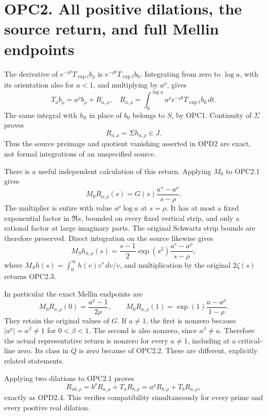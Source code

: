 \section{OPC2. All positive dilations, the source return, and full
Mellin
endpoints}\label{opc2.-all-positive-dilations-the-source-return-and-full-mellin-endpoints}

The derivative of \(e^{-\rho t}T_{\exp t}b_\rho\) is
\(e^{-\rho t}T_{\exp t}b_0\). Integrating from zero to \(\log a\), with
its orientation also for \(a<1\), and multiplying by \(a^\rho\), gives
\[
T_ab_\rho=a^\rho b_\rho+R_{a,\rho},
\quad
R_{a,\rho}=\int_0^{\log a}a^\rho e^{-\rho t}T_{\exp t}b_0\,dt.
\tag{OPC2.1}
\] The same integral with \(h_0\) in place of \(b_0\) belongs to \(S\),
by OPC1. Continuity of \(\Sigma\) proves \[
R_{a,\rho}=\Sigma h_{a,\rho}\in J.
\tag{OPC2.2}
\] Thus the source preimage and quotient vanishing asserted in OPD2 are
exact, not formal integrations of an unspecified source.

There is a useful independent calculation of this return. Applying
\(M_0\) to OPC2.1 gives \[
\boxed{M_0R_{a,\rho}(s)
=G(s)\frac{a^s-a^\rho}{s-\rho}.}
\tag{OPC2.3}
\] The multiplier is entire with value \(a^\rho\log a\) at \(s=\rho\).
It has at most a fixed exponential factor in \(\Re s\), bounded on every
fixed vertical strip, and only a rational factor at large imaginary
parts. The original Schwartz strip bounds are therefore preserved.
Direct integration on the source likewise gives \[
M_Sh_{a,\rho}(s)=
\frac{s-1}{2}\exp(s^2)\frac{a^s-a^\rho}{s-\rho},
\] where \(M_Sh(s)=\int_0^\infty h(v)v^s\,dv/v\), and multiplication by
the original \(2\zeta(s)\) returns OPC2.3.

In particular the exact Mellin endpoints are \[
\boxed{
M_0R_{a,\rho}(0)=\frac{a^\rho-1}{2\rho},\qquad
M_0R_{a,\rho}(1)=\exp(1)\frac{a-a^\rho}{1-\rho}.}
\tag{OPC2.4}
\] They retain the original values of \(G\). If \(a\ne1\), the first is
nonzero because \(|a^\rho|=a^\beta\ne1\) for \(0<\beta<1\). The second
is also nonzero, since \(a^\beta\ne a\). Therefore the actual
representative return is nonzero for every \(a\ne1\), including at a
critical-line zero. Its class in \(Q\) is zero because of OPC2.2. These
are different, explicitly related statements.

Applying two dilations to OPC2.1 proves \[
R_{ab,\rho}=b^\rho R_{a,\rho}+T_aR_{b,\rho}
=a^\rho R_{b,\rho}+T_bR_{a,\rho},
\tag{OPC2.5}
\] exactly as OPD2.4. This verifies compatibility simultaneously for
every prime and every positive real dilation.


